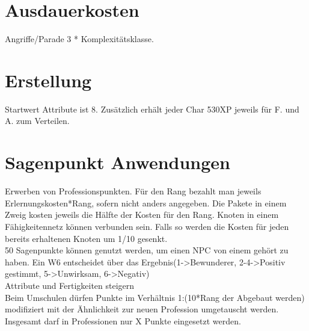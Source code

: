 \documentclass[a4paper,12pt,oneside]{book}
\begin{document}
\chapter{Ausdauerkosten}
Angriffe/Parade 3 * Komplexitätsklasse.


\chapter{Erstellung}
Startwert Attribute ist 8.
Zusätzlich erhält jeder Char 530XP jeweils für F. und A. zum Verteilen.

\chapter{Sagenpunkt Anwendungen}
Erwerben von Professionspunkten. Für den Rang bezahlt man jeweils Erlernungskosten*Rang, sofern nicht anders angegeben. Die Pakete in einem Zweig kosten jeweils die Hälfte der Kosten für den Rang. Knoten in einem Fähigkeitennetz können verbunden sein. Falls so werden die Kosten für jeden bereits erhaltenen Knoten um 1/10 gesenkt.
\\50 Sagenpunkte können genutzt werden, um einen NPC von einem gehört zu haben. Ein W6 entscheidet über das Ergebnis(1->Bewunderer, 2-4->Positiv gestimmt, 5->Unwirksam, 6->Negativ)
\\Attribute und Fertigkeiten steigern
\\Beim Umschulen dürfen Punkte im Verhältnis 1:(10*Rang der Abgebaut werden) modifiziert mit der Ähnlichkeit zur neuen Profession umgetauscht werden. 
\\Insgesamt darf in Professionen nur X Punkte eingesetzt werden.
\end{document}
